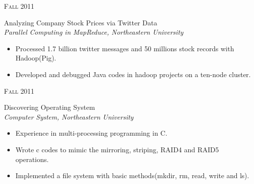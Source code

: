 \documentclass[10pt]{article} %
\begin{document}
{\begin{minipage}[t]{0.5\textwidth}

{\raggedleft\textsc{Fall 2011}\par}

{\raggedright\large Analyzing Company Stock Prices via Twitter Data\\
\textit{Parallel Computing in MapReduce, Northeastern University}\\[5pt]}

\begin{itemize}
      \item Processed 1.7 billion twitter messages and 50 millions stock records with Hadoop(Pig).\vspace*{-8pt}
      \item Developed and debugged Java codes in hadoop projects on a ten-node cluster.\vspace*{-8pt}
\end{itemize}


{\raggedleft\textsc{Fall 2011}\par}

{\raggedright\large Discovering Operating System\\
\textit{Computer System, Northeastern University}\\[5pt]}

\begin{itemize}
       \item Experience in multi-processing programming in C.\vspace*{-8pt}
       \item Wrote c codes to mimic the mirroring, striping, RAID4 and RAID5 operations.\vspace*{-8pt}
       \item Implemented a file system with basic methods(mkdir, rm, read, write and ls).
\end{itemize}









\end{minipage}}
\end{document}
